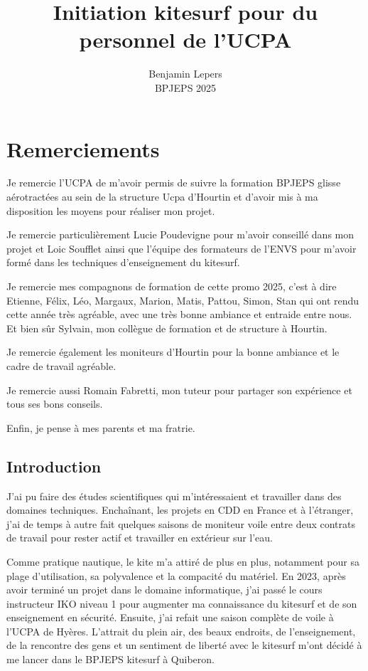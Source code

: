 \documentclass[11pt,a4paper]{report}
\begin{document}
\author{Benjamin Lepers \\ BPJEPS 2025 }
\title{Initiation kitesurf pour du personnel de l'UCPA}
\maketitle
\chapter*{Remerciements}
Je remercie l'UCPA de m'avoir permis de suivre la formation
BPJEPS glisse aérotractées au sein de la structure Ucpa 
d'Hourtin et d'avoir
mis à ma disposition les moyens pour réaliser mon projet.
 
Je remercie particulièrement Lucie Poudevigne pour m'avoir
conseillé  dans mon projet et Loic Soufflet ainsi que 
l'équipe des formateurs de l'ENVS pour m'avoir formé 
dans les techniques d'enseignement du kitesurf.

Je remercie mes compagnons de formation de cette promo 2025,
c'est à dire Etienne, Félix, Léo, Margaux, Marion, Matis, Pattou,
Simon, Stan qui ont rendu cette année très agréable,
avec une très bonne ambiance et entraide entre nous.
Et bien s\^ur Sylvain, mon collègue de formation et 
de structure à Hourtin.

Je remercie également les moniteurs d'Hourtin  pour la
bonne ambiance et le cadre de travail agréable.

Je remercie aussi Romain Fabretti, mon tuteur pour
partager son expérience et tous ses bons conseils.

Enfin, je pense à  mes parents et ma fratrie.


\tableofcontents
\newpage
\section{Introduction}


J'ai pu faire des études scientifiques qui m'intéressaient et
travailler dans des domaines techniques. Enchaînant, les projets en CDD
en France et à l'étranger, j'ai de temps à autre fait quelques saisons de 
moniteur voile  entre deux contrats de travail pour rester
actif et travailler en extérieur sur l'eau.

Comme pratique nautique, le kite m'a attiré de plus en plus, 
notamment pour sa plage d'utilisation, sa polyvalence 
et la compacité du matériel.
En 2023, après avoir terminé un projet dans le domaine informatique,
j'ai passé le cours instructeur IKO\cite{iko} niveau 1
pour augmenter ma connaissance du kitesurf et de son enseignement
en sécurité.
Ensuite, j'ai refait une saison complète de voile à l'UCPA\cite{ucpa} de Hyères.
L'attrait du plein air, des beaux endroits,
de l'enseignement, de la rencontre
des gens et un sentiment de liberté avec le kitesurf  
m'ont décidé à me lancer dans le BPJEPS kitesurf à 
Quiberon.
\end{document}
